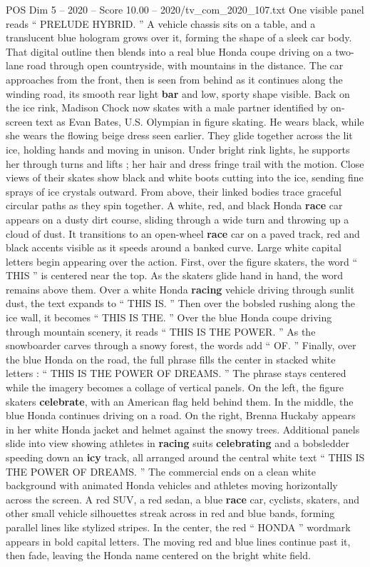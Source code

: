 \begin{textsample}{POS Dim 5 – 2020 – Score 10.00 – 2020/tv\_com\_2020\_107.txt}
One visible panel reads “ PRELUDE HYBRID. ” A vehicle chassis sits on a table, and a translucent blue hologram grows over it, forming the shape of a sleek car body.
That digital outline then blends into a real blue Honda coupe driving on a two-lane road through open countryside, with mountains in the distance.
The car approaches from the front, then is seen from behind as it continues along the winding road, its smooth rear light \textbf{bar} and low, sporty shape visible.
Back on the ice rink, Madison Chock now skates with a male partner identified by on-screen text as Evan Bates, U.S.
Olympian in figure skating.
He wears black, while she wears the flowing beige dress seen earlier.
They glide together across the lit ice, holding hands and moving in unison.
Under bright rink lights, he supports her through turns and lifts ; her hair and dress fringe trail with the motion.
Close views of their skates show black and white boots cutting into the ice, sending fine sprays of ice crystals outward.
From above, their linked bodies trace graceful circular paths as they spin together.
A white, red, and black Honda \textbf{race} car appears on a dusty dirt course, sliding through a wide turn and throwing up a cloud of dust.
It transitions to an open-wheel \textbf{race} car on a paved track, red and black accents visible as it speeds around a banked curve.
Large white capital letters begin appearing over the action.
First, over the figure skaters, the word “ THIS ” is centered near the top.
As the skaters glide hand in hand, the word remains above them.
Over a white Honda \textbf{racing} vehicle driving through sunlit dust, the text expands to “ THIS IS. ” Then over the bobsled rushing along the ice wall, it becomes “ THIS IS THE. ” Over the blue Honda coupe driving through mountain scenery, it reads “ THIS IS THE POWER. ” As the snowboarder carves through a snowy forest, the words add “ OF. ” Finally, over the blue Honda on the road, the full phrase fills the center in stacked white letters : “ THIS IS THE POWER OF DREAMS. ” The phrase stays centered while the imagery becomes a collage of vertical panels.
On the left, the figure skaters \textbf{celebrate}, with an American flag held behind them.
In the middle, the blue Honda continues driving on a road.
On the right, Brenna Huckaby appears in her white Honda jacket and helmet against the snowy trees.
Additional panels slide into view showing athletes in \textbf{racing} suits \textbf{celebrating} and a bobsledder speeding down an \textbf{icy} track, all arranged around the central white text “ THIS IS THE POWER OF DREAMS. ” The commercial ends on a clean white background with animated Honda vehicles and athletes moving horizontally across the screen.
A red SUV, a red sedan, a blue \textbf{race} car, cyclists, skaters, and other small vehicle silhouettes streak across in red and blue bands, forming parallel lines like stylized stripes.
In the center, the red “ HONDA ” wordmark appears in bold capital letters.
The moving red and blue lines continue past it, then fade, leaving the Honda name centered on the bright white field.

\end{textsample}
